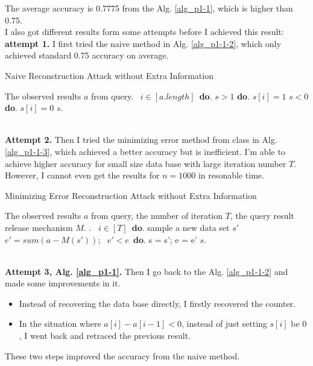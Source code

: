 \documentclass[11pt]{article}
\begin{document}
\begin{enumerate}
\begin{itemize}
%
The average accuracy is 0.7775 from the Alg. \ref{alg_p1-1}, which is higher than 0.75.
%
\\%
I also got different results form some attempts before I achieved this result:
%
\\
%
\textbf{attempt 1.}
I first tried the naive method in Alg. \ref{alg_p1-1-2}, which only achieved standard 0.75 accuracy on average.
%
\begin{algorithm}
\caption{Naive Reconstruction Attack without Extra Information}
\label{alg_p1-1-2}
\begin{algorithmic}
\REQUIRE The observed results $a$ from query.
\ $i\in [a.length]$\ {\bf do}.  
\STATE {} $s > 1$  {\bf do}.
    $s[i] = 1$
\STATE {} $s < 0$  {\bf do}.
	$s[i] = 0$
\RETURN $s$.
\end{algorithmic}
\end{algorithm}
%
\\
%
\textbf{Attempt 2.}
Then I tried the minimizing error method from class in Alg. \ref{alg_p1-1-3}, which achieved a better accuracy but is inefficient. 
I'm able to achieve higher accuracy for small size data base with large iteration number $T$.
However,
I cannot even get the results for $n = 1000$ in resonable time.
%
\begin{algorithm}
\caption{Minimizing Error Reconstruction Attack without Extra Information}
\label{alg_p1-1-3}
\begin{algorithmic}
\REQUIRE The observed results $a$ from query, the number of iteration $T$, the query result release mechanism $M$.
. 
\ $i\in [T]$\ {\bf do}.  
\STATE \qquad sample a new data set $s'$
\STATE \qquad $e' = sum(a - M(s'))$;
\STATE {}\ $ e' < e$\ {\bf do}. s = s'; e = e'
\RETURN $s$.
\end{algorithmic}
\end{algorithm}
%
\\
%
\textbf{Attempt 3, Alg. \ref{alg_p1-1}.}
%
Then I go back to the Alg. \ref{alg_p1-1-2} and made some improvements in it.
\begin{itemize}
	\item Instead of recovering the data base directly, I firstly recovered the counter.
	\item In the situation where $a[i] - a[i - 1] < 0$, instead of just setting $s[i]$ be $0$, I went back and retraced the previous result.
\end{itemize}
These two steps improved the accuracy from the naive method.


\end{itemize}
\end{enumerate}
\end{document}
